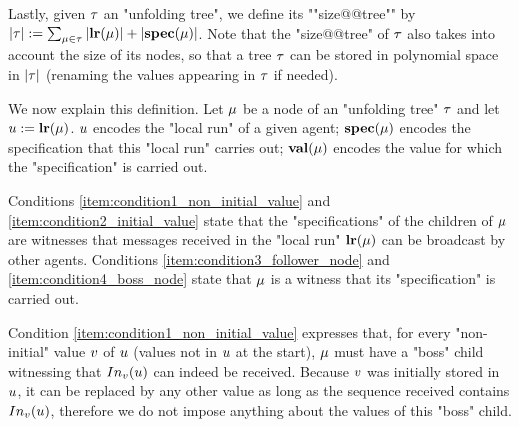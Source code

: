\AP Lastly, given $\tau$ an "unfolding tree", we define its ""size@@tree"" by $|\tau| := \sum_{\mu \in \tau} |\mathbf{lr}(\mu)| + |\mathbf{spec}(\mu)|$. Note that the "size@@tree" of $\tau$ also takes into account the size of its nodes, so that a tree $\tau$ can be stored in polynomial space  in $|\tau|$ (renaming the values appearing in $\tau$ if needed). 



We now explain this definition. Let $\mu$ be a node of an "unfolding tree" $\tau$ and let $u := \mathbf{lr}(\mu)$. $u$ encodes the "local run" of a given agent; $\mathbf{spec}(\mu)$ encodes the specification that this "local run" carries out; $\mathbf{val}(\mu)$ encodes the value for which the "specification" is carried out.

Conditions \ref{item:condition1_non_initial_value} and \ref{item:condition2_initial_value} state that the "specifications" of the children of $\mu$ are witnesses that messages received in the "local run" $\mathbf{lr}(\mu)$ can be broadcast by other agents. Conditions \ref{item:condition3_follower_node} and \ref{item:condition4_boss_node} state that $\mu$ is a witness that its "specification" is carried out. 

Condition \ref{item:condition1_non_initial_value} expresses that, for every "non-initial" value $v$ of $u$ (values not in $u$ at the start), $\mu$ must have a "boss" child witnessing that $\vinput{v}{\localrun}$ can indeed be received. Because $v$ was initially stored in $u$, it can be replaced by any other value as long as the sequence received contains $\vinput{v}{\localrun}$, therefore we do not impose anything about the values of this "boss" child. 

